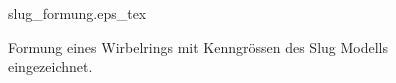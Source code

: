 \begin{figure}
\centering
\def\svgwidth{0.9\columnwidth}
{slug_formung.eps_tex}
\caption{Formung eines Wirbelrings mit Kenngrössen des Slug Modells eingezeichnet. \label{Wirbelringe:fig:slug_formung}}
\end{figure}